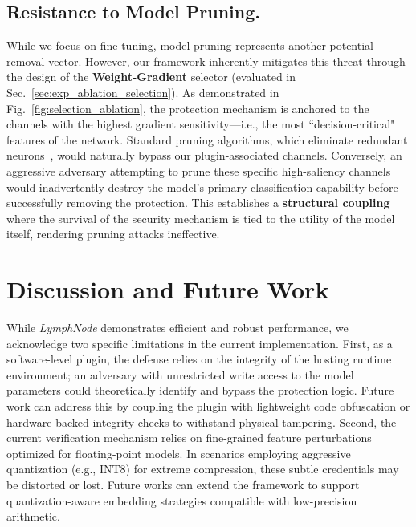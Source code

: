 \documentclass[conference]{IEEEtran}
\begin{document}
\subsection{Resistance to Model Pruning.} 
While we focus on fine-tuning, model pruning represents another potential removal vector. However, our framework inherently mitigates this threat through the design of the \textbf{Weight-Gradient} selector (evaluated in Sec.~\ref{sec:exp_ablation_selection}). As demonstrated in Fig.~\ref{fig:selection_ablation}, the protection mechanism is anchored to the channels with the highest gradient sensitivity—i.e., the most ``decision-critical" features of the network. Standard pruning algorithms, which eliminate redundant neurons~\cite{han2015learning}, would naturally bypass our plugin-associated channels. Conversely, an aggressive adversary attempting to prune these specific high-saliency channels would inadvertently destroy the model's primary classification capability before successfully removing the protection. This establishes a \textbf{structural coupling} where the survival of the security mechanism is tied to the utility of the model itself, rendering pruning attacks ineffective.


\section{Discussion and Future Work}
\label{sec:discussion}
While \textit{LymphNode} demonstrates efficient and robust performance, we acknowledge two specific limitations in the current implementation. First, as a software-level plugin, the defense relies on the integrity of the hosting runtime environment; an adversary with unrestricted write access to the model parameters could theoretically identify and bypass the protection logic. Future work can address this by coupling the plugin with lightweight code obfuscation or hardware-backed integrity checks to withstand physical tampering. Second, the current verification mechanism relies on fine-grained feature perturbations optimized for floating-point models. In scenarios employing aggressive quantization (e.g., INT8) for extreme compression, these subtle credentials may be distorted or lost. Future works can extend the framework to support quantization-aware embedding strategies compatible with low-precision arithmetic.
\end{document}
